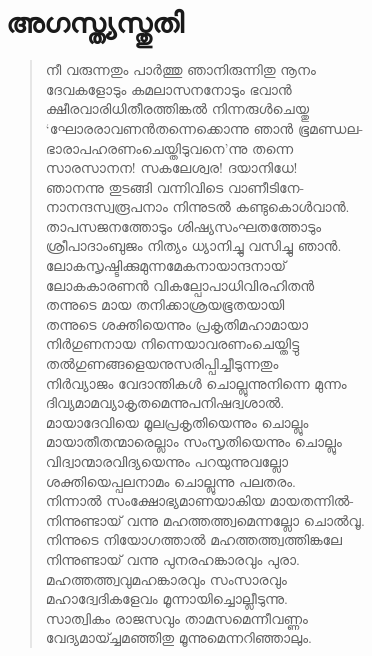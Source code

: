\section{അഗസ്ത്യസ്തുതി}

\begin{verse}
നീ വരുന്നതും പാര്‍ത്തു ഞാനിരുന്നിതു നൂനം\\
ദേവകളോടും കമലാസനനോടും ഭവാന്‍\\
ക്ഷീരവാരിധിതീരത്തിങ്കല്‍ നിന്നരുള്‍ചെയ്തു\\
‘ഘോരരാവണന്‍തന്നെക്കൊന്നു ഞാന്‍ ഭൂമണ്ഡല-\\
ഭാരാപഹരണംചെയ്തിടുവനെ’ന്നു തന്നെ\\
സാരസാനന! സകലേശ്വര! ദയാനിധേ!\\
ഞാനന്നു തുടങ്ങി വന്നിവിടെ വാണീടിനേ-\\
നാനന്ദസ്വരൂപനാം നിന്നുടല്‍ കണ്ടുകൊള്‍വാന്‍.\\
താപസജനത്തോടും ശിഷ്യസംഘതത്തോടും\\
ശ്രീപാദാംബുജം നിത്യം ധ്യാനിച്ചു വസിച്ചു ഞാന്‍.\\
ലോകസൃഷ്ടിക്കുമുന്നമേകനായാന്ദനായ്\\
ലോകകാരണന്‍ വികല്പോപാധിവിരഹിതന്‍\\
തന്നുടെ മായ തനിക്കാശ്രയഭൂതയായി\\
തന്നുടെ ശക്തിയെന്നും പ്രകൃതിമഹാമായാ\\
നിര്‍ഗുണനായ നിന്നെയാവരണംചെയ്തിട്ടു\\
തല്‍ഗുണങ്ങളെയനുസരിപ്പിച്ചീടുന്നതും\\
നിര്‍വ്യാജം വേദാന്തികള്‍ ചൊല്ലുന്നുനിന്നെ മുന്നം\\
ദിവ്യമാമവ്യാകൃതമെന്നുപനിഷദ്വശാല്‍.\\
മായാദേവിയെ മൂലപ്രകൃതിയെന്നും ചൊല്ലും\\
മായാതീതന്മാരെല്ലാം സംസൃതിയെന്നും ചൊല്ലും\\
വിദ്വാന്മാരവിദ്യയെന്നും പറയുന്നുവല്ലോ\\
ശക്തിയെപ്പലനാമം ചൊല്ലുന്നു പലതരം.\\
നിന്നാല്‍ സംക്ഷോഭ്യമാണയാകിയ മായതന്നില്‍-\\
നിന്നുണ്ടായ് വന്നു മഹത്തത്ത്വമെന്നല്ലോ ചൊല്‍വൂ.\\
നിന്നുടെ നിയോഗത്താല്‍ മഹത്തത്ത്വത്തിങ്കലേ\\
നിന്നുണ്ടായ് വന്നു പുനരഹങ്കാരവും പുരാ.\\
മഹത്തത്ത്വവുമഹങ്കാരവും സംസാരവും\\
മഹാദ്വേദികളേവം മൂന്നായിച്ചൊല്ലീടുന്നു.\\
സാത്വികം രാജസവും താമസമെന്നീവണ്ണം\\
വേദ്യമായ്ച്ചമഞ്ഞിതു മൂന്നുമെന്നറിഞ്ഞാലും.\\

\end{verse}
